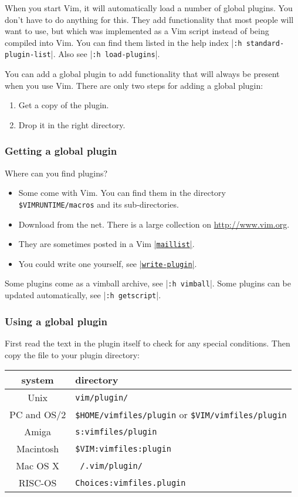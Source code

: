 When you start Vim, it will automatically load a number of global plugins.
You don't have to do anything for this.
They add functionality that most people will want to use, but which was implemented as a Vim script instead of being compiled into Vim.
You can find them listed in the help index |\texttt{:h standard-plugin-list}|.
Also see |\texttt{:h load-plugins}|.

\label{add-global-plugin}
You can add a global plugin to add functionality that will always be present
when you use Vim.  There are only two steps for adding a global plugin:
\begin{enumerate}
				\item Get a copy of the plugin.
				\item Drop it in the right directory.
\end{enumerate}

\subsubsection{Getting a global plugin}

Where can you find plugins?
\begin{itemize}
				\item Some come with Vim.
								You can find them in the directory \texttt{\$VIMRUNTIME/macros} and its sub-directories.
				\item Download from the net. There is a large collection on \url{http://www.vim.org}.
				\item They are sometimes posted in a Vim \hyperref[maillist]{|\texttt{maillist}|}.
				\item You could write one yourself, see \hyperref[write-plugin]{|\texttt{write-plugin}|}.
\end{itemize}

Some plugins come as a vimball archive, see |\texttt{:h vimball}|.
Some plugins can be updated automatically, see |\texttt{:h getscript}|.

\subsubsection{Using a global plugin}

First read the text in the plugin itself to check for any special conditions.
Then copy the file to your plugin directory:

\begin{longtable}{c l}
		system & directory \\ \hline
		Unix & \texttt{vim/plugin/} \\
		PC and OS/2 & \texttt{\$HOME/vimfiles/plugin} or \texttt{\$VIM/vimfiles/plugin} \\
		Amiga & \texttt{s:vimfiles/plugin} \\
		Macintosh & \texttt{\$VIM:vimfiles:plugin} \\
		Mac OS X & \texttt{~/.vim/plugin/} \\
		RISC-OS & \texttt{Choices:vimfiles.plugin}
\end{longtable}

